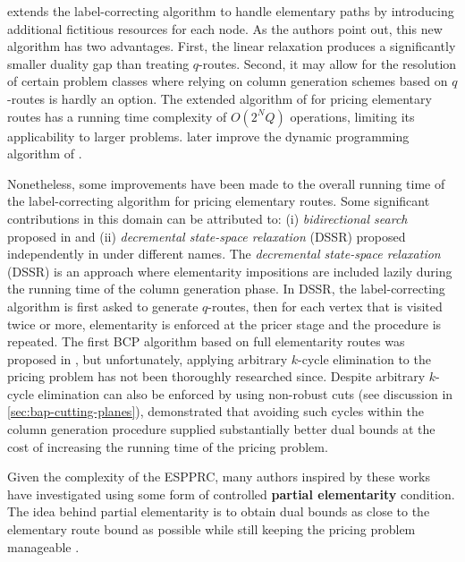 \textcite{feillet2004} extends the label-correcting algorithm
to handle elementary paths by introducing additional fictitious resources for each node.
As the authors point out, this new algorithm has two advantages.
First, the linear relaxation produces a significantly smaller duality gap than treating $q$-routes.
Second, it may allow for the resolution of certain problem classes
where relying on column generation schemes based on $q$-routes is hardly an option.
The extended algorithm of \citeauthor{feillet2004} for pricing elementary routes
has a running time complexity of $O(2^N Q)$ operations,
limiting its applicability to larger problems.
\textcite{righini2006} later improve the dynamic programming algorithm  of \citeauthor{feillet2004}.

Nonetheless, some improvements have been made to the overall running time
of the label-correcting algorithm for pricing elementary routes.
Some significant contributions in this domain can be attributed to:
(i) \textit{bidirectional search} proposed in \textcite{righini2006}
and (ii) \textit{decremental state-space relaxation} (DSSR) proposed independently in
\textcite{boland2006, righini2008} under different names.
The \textit{decremental state-space relaxation} (DSSR)
is an approach where elementarity impositions are included lazily
during the running time of the column generation phase.
In DSSR, the label-correcting algorithm
is first asked to generate $q$-routes, then for each vertex that is visited
twice or more, elementarity is enforced at the pricer stage
and the procedure is repeated.
The first BCP algorithm based on full elementarity routes
was proposed in \cite{chabrier2006}, but unfortunately,
applying arbitrary $k$-cycle elimination to the pricing problem
has not been thoroughly researched since.
Despite arbitrary $k$-cycle elimination can also
be enforced by using non-robust cuts (see discussion in \cref{sec:bap-cutting-planes}),
\citeauthor{feillet2004} demonstrated that avoiding such cycles
within the column generation procedure supplied
substantially better dual bounds at the cost
of increasing the running time of the pricing problem.

\medskip

Given the complexity of the ESPPRC,
many authors inspired by these works have investigated using
some form of controlled \textbf{partial elementarity} condition.
The idea behind partial elementarity is to obtain dual bounds
as close to the elementary route bound as possible
while still keeping the pricing problem manageable \parencite{contardo2015}.

